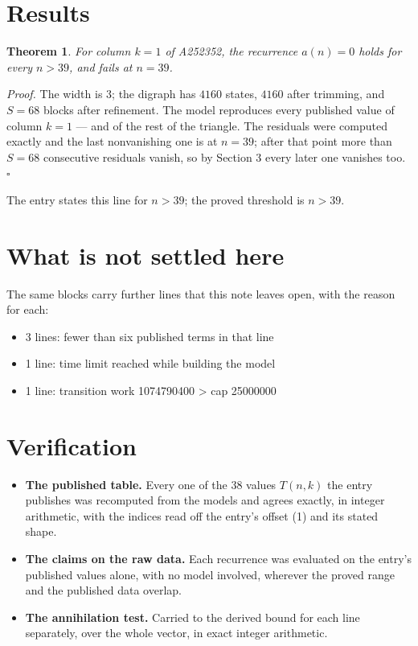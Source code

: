 \documentclass[11pt]{article}
\newtheorem{theorem}{Theorem}
\theoremstyle{definition}
\begin{document}
\section{Results}

\begin{theorem} For column $k = 1$ of A252352, the recurrence $a(n) = 0$ holds for every $n > 39$, and fails at $n = 39$.\end{theorem}

{\itshape Proof.} The width is $3$; the digraph has $4160$ states, $4160$ after trimming, and $S = 68$ blocks after refinement. The model reproduces every published value of column $k = 1$ --- and of the rest of the triangle. The residuals were computed exactly and the last nonvanishing one is at $n = 39$; after that point more than $S = 68$ consecutive residuals vanish, so by Section 3 every later one vanishes too. $\square$

The entry states this line for $n > 39$; the proved threshold is $n > 39$.

\section{What is not settled here}

The same blocks carry further lines that this note leaves open, with the reason for each:

\begin{itemize}

\item 3 lines: fewer than six published terms in that line

\item 1 line: time limit reached while building the model

\item 1 line: transition work 1074790400 > cap 25000000

\end{itemize}

\section{Verification}

\begin{itemize}

\item {\bfseries The published table.} Every one of the 38 values $T(n,k)$ the entry publishes was recomputed from the models and agrees exactly, in integer arithmetic, with the indices read off the entry's offset (1) and its stated shape.

\item {\bfseries The claims on the raw data.} Each recurrence was evaluated on the entry's published values alone, with no model involved, wherever the proved range and the published data overlap.

\item {\bfseries The annihilation test.} Carried to the derived bound for each line separately, over the whole vector, in exact integer arithmetic.

\end{itemize}
\end{document}

